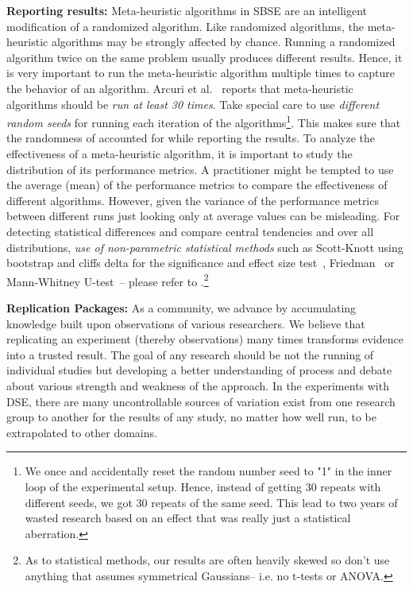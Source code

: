 \documentclass[sigconf,anonymous,review]{acmart}
\begin{document}
  \noindent\textbf{Reporting results: }
Meta-heuristic algorithms in SBSE are an intelligent modification of a randomized algorithm. Like randomized algorithms, the meta-heuristic algorithms may be strongly affected by chance. Running a randomized
algorithm twice on the same problem usually produces different results. Hence, it is very important to run the meta-heuristic algorithm multiple times to capture the behavior of an algorithm. Arcuri et al.~\cite{arcuri2011practical} reports that meta-heuristic algorithms should be \textit{run at least 30 times}. Take special care to use \textit{different random seeds} for running each iteration of the algorithms\footnote{We once and accidentally reset the random number seed to "1" in the inner loop of the experimental setup. Hence,  instead of getting 30 repeats with different seeds, we got 30 repeats of the same seed. This lead to two years of wasted research based
on an effect that was really just a statistical aberration.}. This makes sure that the randomness of accounted for while reporting the results. 
To analyze the effectiveness of a meta-heuristic algorithm, it is important to study the distribution of its performance metrics. A practitioner might be tempted to use the average (mean) of the performance metrics to compare the effectiveness of different algorithms. However, given the variance of the performance metrics between different runs just looking only at average values can be misleading. For detecting statistical differences and compare central tendencies and over all distributions, \textit{use of non-parametric statistical methods} such as Scott-Knott using bootstrap and cliffs delta for the significance and effect size test~\cite{mittas2013ranking, ghotra2015revisiting}, Friedman~\cite{lessmann2008benchmarking} or Mann-Whitney U-test~\cite{arcuri2011practical}-- please refer to \cite{arcuri2011practical, arcuri2014hitchhiker}.\footnote{
As to statistical methods, our results are often heavily skewed so don't use anything that assumes symmetrical Gaussians-- i.e.   no t-tests or ANOVA.}


  \noindent\textbf{Replication Packages: } As a community, we advance by accumulating knowledge built upon observations of various researchers. We believe that replicating an experiment (thereby observations) many times transforms evidence into a trusted result. The goal of any research should be not the running
of individual studies but developing a better understanding
of process and debate about various strength and weakness of the approach.
In the experiments with DSE, there are many uncontrollable sources of variation exist from
one research group to another for the results of any study, no
matter how well run, to be extrapolated to other domains. 
\end{document}
